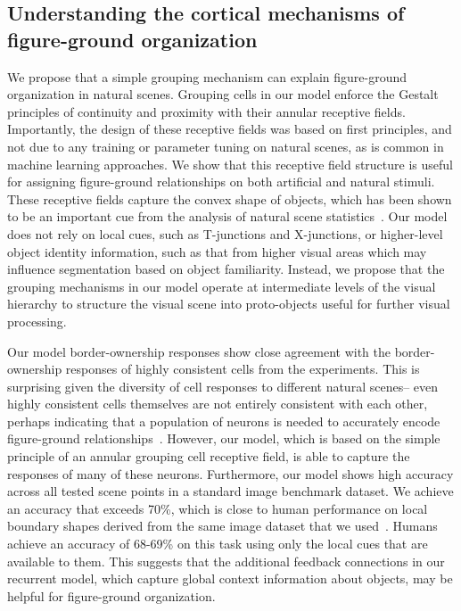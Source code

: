 
%

\subsection{Understanding the cortical mechanisms of figure-ground organization}
We propose that a simple grouping mechanism can explain figure-ground organization in natural scenes. Grouping cells in our model enforce the Gestalt principles of continuity and proximity with their annular receptive fields. Importantly, the design of these receptive fields was based on first principles, and not due to any training or parameter tuning on natural scenes, as is common in machine learning approaches. We show that this receptive field structure is useful for assigning figure-ground relationships on both artificial and natural stimuli. These receptive fields capture the convex shape of objects, which has been shown to be an important cue from the analysis of natural scene statistics~\citep{Sigman_etal01}. Our model does not rely on local cues, such as T-junctions and X-junctions, or higher-level object identity information, such as that from higher visual areas which may influence segmentation based on object familiarity. Instead, we propose that the grouping mechanisms in our model operate at intermediate levels of the visual hierarchy to structure the visual scene into proto-objects useful for further visual processing.

Our model border-ownership responses show close agreement with the border-ownership responses of highly consistent cells from the experiments. This is surprising given the diversity of cell responses to different natural scenes-- even highly consistent cells themselves are not entirely consistent with each other, perhaps indicating that a population of neurons is needed to accurately encode figure-ground relationships~\citep{Hesse_Tsao16}. However, our model, which is based on the simple principle of an annular grouping cell receptive field, is able to capture the responses of many of these neurons.
%
%
Furthermore, our model shows high accuracy across all tested scene points in a standard image benchmark dataset. We achieve an accuracy that exceeds 70\%, which is close to human performance on local boundary shapes derived from the same image dataset that we used~\citep{Fowlkes_etal07}. Humans achieve an accuracy of 68-69\% on this task using only the local cues that are available to them. This suggests that the additional feedback connections in our recurrent model, which capture global context information about objects, may be helpful for figure-ground organization.

